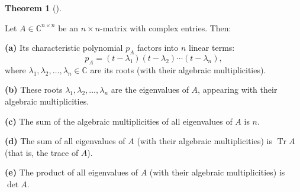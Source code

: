 \documentclass[numbers=enddot,12pt,final,onecolumn,notitlepage]{scrartcl}%
\numberwithin{exer}{subsection}
\theoremstyle{definition}
\newtheorem{theo}{Theorem}[subsection]
\newenvironment{theorem}[1][]
{\begin{theo}[#1]\begin{leftbar}}
{\end{leftbar}\end{theo}}
\begin{document}
\begin{theorem}
\label{thm.schurtri.ch.fta-cons}Let $A\in\mathbb{C}^{n\times n}$ be an
$n\times n$-matrix with complex entries. Then:

\textbf{(a)} Its characteristic polynomial $p_{A}$ factors into $n$ linear
terms:%
\begin{equation}
p_{A}=\left(  t-\lambda_{1}\right)  \left(  t-\lambda_{2}\right)
\cdots\left(  t-\lambda_{n}\right)  ,\label{eq.schurtri.ch.pA-factors}%
\end{equation}
where $\lambda_{1},\lambda_{2},\ldots,\lambda_{n}\in\mathbb{C}$ are its roots
(with their algebraic multiplicities). \medskip

\textbf{(b)} These roots $\lambda_{1},\lambda_{2},\ldots,\lambda_{n}$ are the
eigenvalues of $A$, appearing with their algebraic multiplicities. \medskip

\textbf{(c)} The sum of the algebraic multiplicities of all eigenvalues of $A$
is $n$. \medskip

\textbf{(d)} The sum of all eigenvalues of $A$ (with their algebraic
multiplicities) is $\operatorname*{Tr}A$ (that is, the trace of $A$). \medskip

\textbf{(e)} The product of all eigenvalues of $A$ (with their algebraic
multiplicities) is $\det A$.
\end{theorem}
\end{document}
